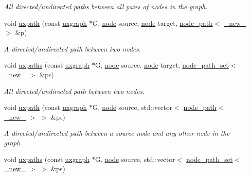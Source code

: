 \begin{DoxyCompactItemize}
\begin{DoxyCompactList}\small\item\em All directed/undirected paths between all pairs of nodes in the graph. \end{DoxyCompactList}\item 
void \hyperlink{namespacelgraph_1_1traversal_a143fd991f5e035c64c94b2ac8d84b08c}{uxpath} (const \hyperlink{classlgraph_1_1uxgraph}{uxgraph} $\ast$G, \hyperlink{namespacelgraph_a397169dd66adf725210a30fb7251773e}{node} source, \hyperlink{namespacelgraph_a397169dd66adf725210a30fb7251773e}{node} target, \hyperlink{classlgraph_1_1node__path}{node\+\_\+path}$<$ \hyperlink{namespacelgraph_aa930092705699c3af78e3a4de7880a3f}{\+\_\+new\+\_\+} $>$ \&p)
\begin{DoxyCompactList}\small\item\em A directed/undirected path between two nodes. \end{DoxyCompactList}\item 
void \hyperlink{namespacelgraph_1_1traversal_a16078c9a8e08e18e017590e6e13860ec}{uxpaths} (const \hyperlink{classlgraph_1_1uxgraph}{uxgraph} $\ast$G, \hyperlink{namespacelgraph_a397169dd66adf725210a30fb7251773e}{node} source, \hyperlink{namespacelgraph_a397169dd66adf725210a30fb7251773e}{node} target, \hyperlink{namespacelgraph_a0570ce57129123d5816913d287f6cc73}{node\+\_\+path\+\_\+set}$<$ \hyperlink{namespacelgraph_aa930092705699c3af78e3a4de7880a3f}{\+\_\+new\+\_\+} $>$ \&ps)
\begin{DoxyCompactList}\small\item\em All directed/undirected path between two nodes. \end{DoxyCompactList}\item 
void \hyperlink{namespacelgraph_1_1traversal_a820cbf2f4ae33b2d358b3636679709fb}{uxpath} (const \hyperlink{classlgraph_1_1uxgraph}{uxgraph} $\ast$G, \hyperlink{namespacelgraph_a397169dd66adf725210a30fb7251773e}{node} source, std\+::vector$<$ \hyperlink{classlgraph_1_1node__path}{node\+\_\+path}$<$ \hyperlink{namespacelgraph_aa930092705699c3af78e3a4de7880a3f}{\+\_\+new\+\_\+} $>$ $>$ \&ps)
\begin{DoxyCompactList}\small\item\em A directed/undirected path between a source node and any other node in the graph. \end{DoxyCompactList}\item 
void \hyperlink{namespacelgraph_1_1traversal_a1dae339c9382f50b0ebaea7d52c87aee}{uxpaths} (const \hyperlink{classlgraph_1_1uxgraph}{uxgraph} $\ast$G, \hyperlink{namespacelgraph_a397169dd66adf725210a30fb7251773e}{node} source, std\+::vector$<$ \hyperlink{namespacelgraph_a0570ce57129123d5816913d287f6cc73}{node\+\_\+path\+\_\+set}$<$ \hyperlink{namespacelgraph_aa930092705699c3af78e3a4de7880a3f}{\+\_\+new\+\_\+} $>$ $>$ \&ps)

\end{DoxyCompactItemize}
